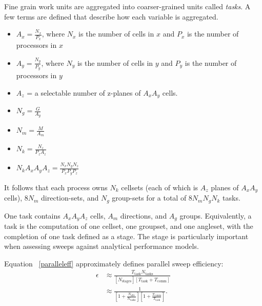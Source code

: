 \documentclass[11pt, letterpaper,titlepage,oneside]{article}
\begin{document}
Fine grain work units are aggregated into coarser-grained units called \textit{tasks}. A few terms are defined that describe how each variable is aggregated.
\begin{itemize}
\item $A_x = \frac{N_x}{P_x}$, where $N_x$ is the number of cells in $x$ and $P_x$ is the number of processors in $x$
\item $A_y = \frac{N_y}{P_y}$, where $N_y$ is the number of cells in $y$ and $P_y$ is the number of processors in $y$
\item $A_z$ = a selectable number of z-planes of $A_x A_y$ cells.
\item $N_g = \frac{G}{A_g}$
\item $N_m = \frac{M}{A_m}$
\item $N_k = \frac{N_z}{P_z A_z}$
\item $N_k A_x A_y A_z = \frac{N_x N_y N_z}{P_x P_y P_z}$
\end{itemize}

It follows that each process owns $N_k$ cellsets (each of which is $A_z$ planes of $A_x A_y$ cells), $8N_m$ direction-sets, and $N_g$ group-sets for a total of $8N_m N_g N_k$ tasks.

One task contains $A_x A_y A_z$ cells, $A_m$ directions, and $A_g$ groups. Equivalently, a task is the computation of one cellset, one groupset, and one angleset, with the completion of one task defined as a stage.  The stage is particularly important when assessing sweeps against analytical performance models. 

Equation ~\eqref{paralleleff} approximately defines parallel sweep efficiency:
\begin{equation}\label{paralleleff}
\begin{split}
\epsilon &\approx \frac{T_{\text{task}} N_{\text{tasks}}}{[N_{\text{stages}}] [T_{\text{task}} + T_{\text{comm}}]} \\
            &\approx\frac{1}{[1+\frac{N_{\text{idle}}}{N_{\text{tasks}}}][1 + \frac{T_{\text{comm}}}{T_{\text{task}}}]}.
\end{split}
\end{equation}
\end{document}
